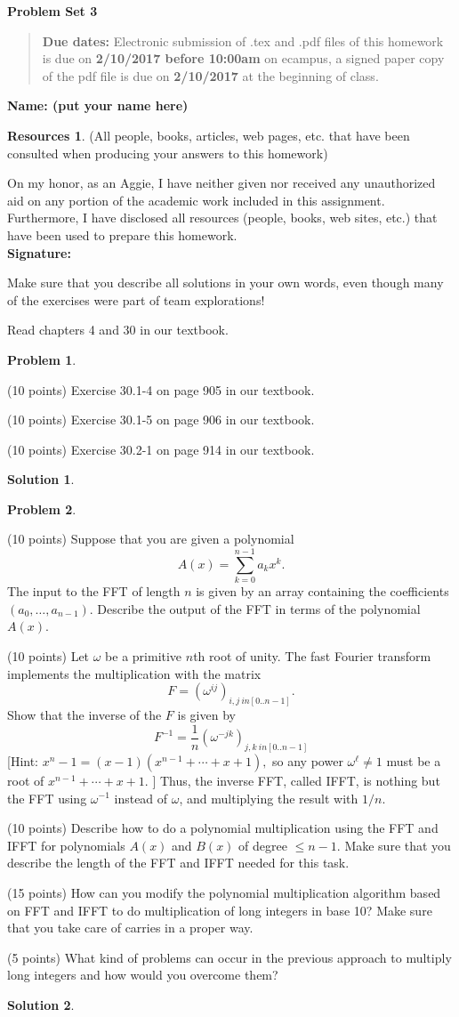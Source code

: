 \documentclass{article}
\theoremstyle{definition}
\newtheorem{problem}{Problem}
\newtheorem*{solution}{Solution}
\newtheorem*{resources}{Resources}
\newcommand{\name}[1]{\noindent\textbf{Name: #1}}
\newcommand{\honor}{\noindent On my honor, as an Aggie, I have neither
  given nor received any unauthorized aid on any portion of the
  academic work included in this assignment. Furthermore, I have
  disclosed all resources (people, books, web sites, etc.) that have
  been used to prepare this homework. \\[1ex]
 \textbf{Signature:} \underline{\hspace*{5cm}} }
\newcommand{\problemset}[1]{\begin{center}\textbf{Problem Set
      #1}\end{center}}
\newcommand{\duedate}[2]{\begin{quote}\textbf{Due dates:} Electronic
    submission of .tex and .pdf files of this homework is due on
    \textbf{#1} on ecampus, a signed paper copy of the pdf file is due
    on \textbf{#2} at the beginning of class. \end{quote} }
\begin{document}
\problemset{3}
\duedate{2/10/2017 before 10:00am}{2/10/2017}
\name{ (put your name here)}
\begin{resources} (All people, books, articles, web pages, etc. that
  have been consulted when producing your answers to this homework)
\end{resources}
\honor

\newpage
Make sure that you describe all solutions in your own words, even
though many of the exercises were part of team explorations!

Read chapters 4 and 30 in our textbook. 

\begin{problem}
\begin{compactenum}[(a)]
\item (10 points) Exercise 30.1-4 on page 905 in our textbook. 
\item (10 points) Exercise 30.1-5 on page 906 in our textbook. 
\item (10 points) Exercise 30.2-1 on page 914 in our textbook. 
\end{compactenum}
\end{problem}
\begin{solution}
\end{solution}

\begin{problem} 
\begin{compactenum}[(a)]
\item (10 points) Suppose that you are given a polynomial 
$$ A(x) = \sum_{k=0}^{n-1} a_k x^k.$$ 
The input to the FFT of length $n$ is given by an array containing the coefficients
$(a_0,\ldots, a_{n-1})$. Describe the output of the FFT in terms of
the polynomial $A(x)$. 

\item (10 points) Let $\omega$ be a primitive $n$th root of unity. 
The fast Fourier transform implements the multiplication with
  the matrix 
$$ F = (\omega^{ij})_{i,j\ in [0..n-1]}.$$
Show that the inverse of the $F$ is given by 
$$ F^{-1} = \frac{1}{n}  (\omega^{-jk})_{j,k\ in [0..n-1]}$$
[Hint: $x^n-1= (x-1)(x^{n-1}+\cdots + x + 1),$ so any power
$\omega^\ell\neq 1$  must be a root of $x^{n-1}+\cdots + x + 1$.  ]  
Thus, the inverse FFT, called IFFT, is nothing but the FFT using
$\omega^{-1}$ instead of $\omega$, and multiplying the result with
$1/n$. 
\item (10 points) Describe how to do a polynomial multiplication using the FFT and
  IFFT for polynomials $A(x)$ and $B(x)$ of degree $\le n-1$. Make
  sure that you describe the length of the FFT and IFFT needed for
  this task. 
\item (15 points) How can you modify the polynomial multiplication algorithm based
  on FFT and IFFT to do multiplication of long integers in base 10?
  Make sure that you take care of carries in a proper way. 
\item (5 points) What kind of problems can occur in the previous
  approach to multiply long integers and how would you overcome them? 
\end{compactenum}
\end{problem}
\begin{solution}
\end{solution}
\end{document}
